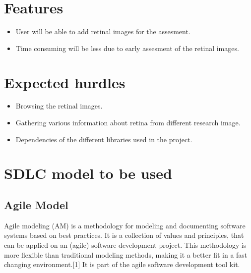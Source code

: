 \section{Features}
\begin{itemize}
	\item User will be able to add retinal images for the assesment.
	
	\item Time consuming will be less due to early assesment of the retinal images.
	 
\end{itemize}

	 	
\section{Expected hurdles}
\begin{itemize}
\item Browsing the retinal images.  
\item Gathering various information about retina from different research image.
\item Dependencies of the different libraries used in the project.

\end{itemize}

\section{SDLC model to be used}
\subsection{Agile Model}

 Agile modeling (AM) is a methodology for modeling and documenting software systems based on best practices. It is a collection of values and principles, that can be applied on an (agile) software development project. This methodology is more flexible than traditional modeling methods, making it a better fit in a fast changing environment.[1] It is part of the agile software development tool kit.
 
